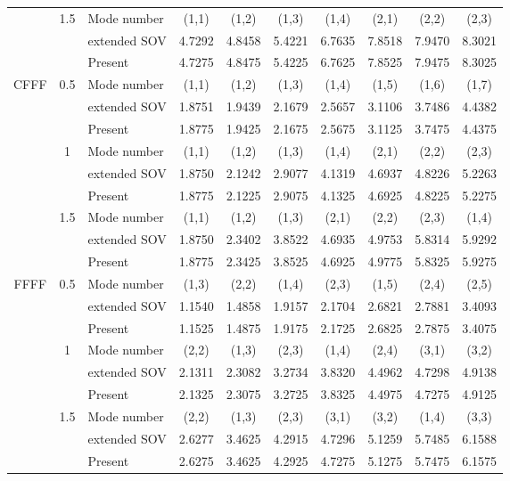 \documentclass[preprint,12pt]{elsarticle}
\begin{document}
\begin{table}[!htbp]
\begin{tabular}{c c l c c c c c c c}
		& 1.5 & Mode number  &(1,1) & (1,2) & (1,3) & (1,4) & (2,1) & (2,2) & (2,3) \\
		&     & extended SOV \Citealp{xing2020extended}   & 4.7292 & 4.8458 & 5.4221 & 6.7635 & 7.8518 & 7.9470 & 8.3021 \\
		&     & Present       & 4.7275 & 4.8475 & 5.4225 & 6.7625 & 7.8525 & 7.9475 & 8.3025 \\
		CFFF & 0.5 & Mode number   & (1,1) & (1,2) & (1,3) & (1,4) & (1,5) & (1,6) & (1,7) \\
		&     & extended SOV \Citealp{xing2020extended}   & 1.8751 & 1.9439 & 2.1679 & 2.5657 & 3.1106 & 3.7486 & 4.4382 \\
		&     & Present       & 1.8775 & 1.9425 & 2.1675 & 2.5675 & 3.1125 & 3.7475 & 4.4375 \\
		& 1   & Mode number  &(1,1) & (1,2) & (1,3) & (1,4) & (2,1) & (2,2) & (2,3) \\
		&     & extended SOV \Citealp{xing2020extended}   & 1.8750 & 2.1242 & 2.9077 & 4.1319 & 4.6937 & 4.8226 & 5.2263 \\
		&     & Present       & 1.8775 & 2.1225 & 2.9075 & 4.1325 & 4.6925 & 4.8225 & 5.2275 \\
		& 1.5 & Mode number  &(1,1) & (1,2) & (1,3) & (2,1) & (2,2) & (2,3) & (1,4) \\
		&     & extended SOV \Citealp{xing2020extended}   & 1.8750 & 2.3402 & 3.8522 & 4.6935 & 4.9753 & 5.8314 & 5.9292 \\
		&     & Present       & 1.8775 & 2.3425 & 3.8525 & 4.6925 & 4.9775 & 5.8325 & 5.9275 \\
		FFFF & 0.5 & Mode number  &(1,3) & (2,2) & (1,4) & (2,3) & (1,5) & (2,4) & (2,5) \\
		&     & extended SOV \Citealp{xing2020extended}   & 1.1540 & 1.4858 & 1.9157 & 2.1704 & 2.6821 & 2.7881 & 3.4093 \\
		&     & Present       & 1.1525 & 1.4875 & 1.9175 & 2.1725 & 2.6825 & 2.7875 & 3.4075 \\
		& 1   & Mode number  &(2,2) & (1,3) & (2,3) & (1,4) & (2,4) & (3,1) & (3,2) \\
		&     & extended SOV \Citealp{xing2020extended}   & 2.1311 & 2.3082 & 3.2734 & 3.8320 & 4.4962 & 4.7298 & 4.9138 \\
		&     & Present       & 2.1325 & 2.3075 & 3.2725 & 3.8325 & 4.4975 & 4.7275 & 4.9125 \\
		& 1.5 & Mode number  &(2,2) & (1,3) & (2,3) & (3,1) & (3,2) & (1,4) & (3,3) \\
		&     & extended SOV \Citealp{xing2020extended}   & 2.6277 & 3.4625 & 4.2915 & 4.7296 & 5.1259 & 5.7485 & 6.1588 \\
		&     & Present       & 2.6275 & 3.4625 & 4.2925 & 4.7275 & 5.1275 & 5.7475 & 6.1575 \\
		\bottomrule
	\end{tabular}
	\label{tab:sov3}
\end{table}
\end{document}
